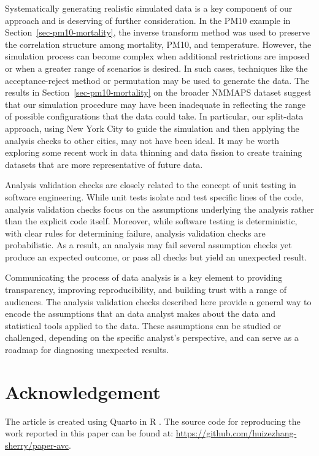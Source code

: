 \documentclass[
  12pt,
]{interact}
\begin{document}
Systematically generating realistic simulated data is a key component of
our approach and is deserving of further consideration. In the PM10
example in Section~\ref{sec-pm10-mortality}, the inverse transform
method was used to preserve the correlation structure among mortality,
PM10, and temperature. However, the simulation process can become
complex when additional restrictions are imposed or when a greater range
of scenarios is desired. In such cases, techniques like the
acceptance-reject method or permutation may be used to generate the
data. The results in Section~\ref{sec-pm10-mortality} on the broader
NMMAPS dataset suggest that our simulation procedure may have been
inadequate in reflecting the range of possible configurations that the
data could take. In particular, our split-data approach, using New York
City to guide the simulation and then applying the analysis checks to
other cities, may not have been ideal. It may be worth exploring some
recent work in data thinning \citep{neufeld2024data} and data fission
\citep{leiner2023data} to create training datasets that are more
representative of future data.

Analysis validation checks are closely related to the concept of unit
testing in software engineering. While unit tests isolate and test
specific lines of the code, analysis validation checks focus on the
assumptions underlying the analysis rather than the explicit code
itself. Moreover, while software testing is deterministic, with clear
rules for determining failure, analysis validation checks are
probabilistic. As a result, an analysis may fail several assumption
checks yet produce an expected outcome, or pass all checks but yield an
unexpected result.

Communicating the process of data analysis is a key element to providing
transparency, improving reproducibility, and building trust with a range
of audiences. The analysis validation checks described here provide a
general way to encode the assumptions that an data analyst makes about
the data and statistical tools applied to the data. These assumptions
can be studied or challenged, depending on the specific analyst's
perspective, and can serve as a roadmap for diagnosing unexpected
results.

\section{Acknowledgement}\label{acknowledgement}

The article is created using Quarto \citep{Allaire_Quarto_2022} in R
\citep{R}. The source code for reproducing the work reported in this
paper can be found at:
\url{https://github.com/huizezhang-sherry/paper-avc}.


\renewcommand\refname{References}

\end{document}
